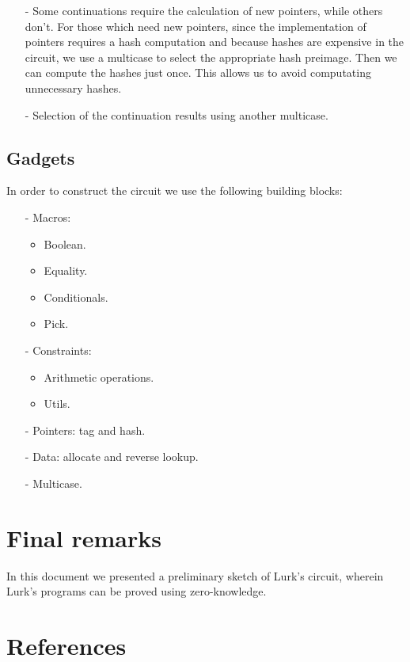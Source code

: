 \documentclass[10pt, english]{article}
\begin{document}
\begin{itemize}
	\item[-] Some continuations require the calculation of new pointers, while others don't. For those which need new pointers, since the implementation of pointers requires a hash computation and because hashes are expensive in the circuit, we use a multicase to select the appropriate hash preimage. Then we can compute the hashes just once. This allows us to avoid computating unnecessary hashes.
	\item[-] Selection of the continuation results using another multicase.
\end{itemize}

\subsection{Gadgets}

In order to construct the circuit we use the following building blocks:

\begin{itemize}
	\item[-] Macros:
	\begin{itemize}
		\item Boolean.
	    \item Equality.
		\item Conditionals.
		\item Pick.
	\end{itemize}
	\item[-] Constraints:
	\begin{itemize}
        \item Arithmetic operations.
		\item Utils.
	\end{itemize}
	\item[-] Pointers: tag and hash.
    \item[-] Data: allocate and reverse lookup.
    \item[-] Multicase.
\end{itemize}

\section{Final remarks}

In this document we presented a preliminary sketch of Lurk's circuit, wherein Lurk's programs can be proved using zero-knowledge.

\section{References}




\end{document}
